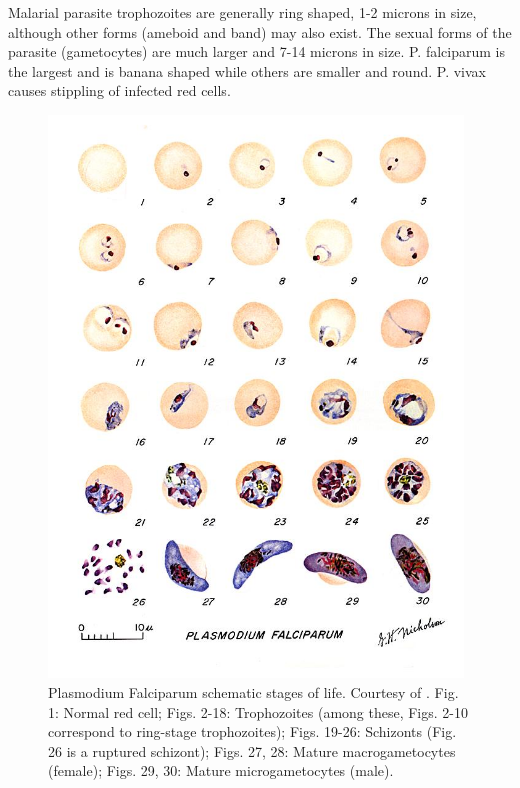 \documentclass[final,a4paper,12pt,english]{UnicaPhdThesis3}
\begin{document}
Malarial parasite trophozoites are generally ring shaped, 1-2 microns in size, although other forms (ameboid and band) may also exist. The sexual forms of the parasite (gametocytes) are much larger and 7-14 microns in size. P. falciparum is the largest and is banana shaped while others are smaller and round. P. vivax causes stippling of infected red cells.
\begin{figure}[!htbp]
	\centering
	\includegraphics[width=0.98\textwidth]{images/malaria_th/mal_falc}
	\caption{\label{fig:falci_th} Plasmodium Falciparum schematic stages of life. Courtesy of \cite{Med_cdc}.
	Fig. 1: Normal red cell; Figs. 2-18: Trophozoites (among these, Figs. 2-10 correspond to ring-stage trophozoites); Figs. 19-26: Schizonts (Fig. 26 is a ruptured schizont); Figs. 27, 28: Mature macrogametocytes (female); Figs. 29, 30: Mature microgametocytes (male).}
\end{figure}
\end{document}
